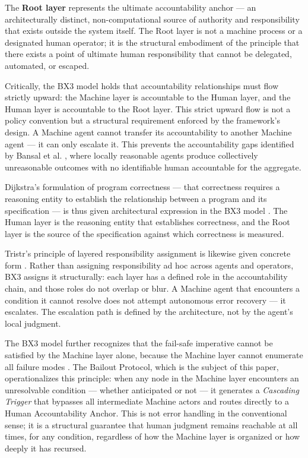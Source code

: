 The \textbf{Root layer} represents the ultimate accountability anchor — an architecturally distinct, non-computational source of authority and responsibility that exists outside the system itself. The Root layer is not a machine process or a designated human operator; it is the structural embodiment of the principle that there exists a point of ultimate human responsibility that cannot be delegated, automated, or escaped.

Critically, the BX3 model holds that accountability relationships must flow strictly upward: the Machine layer is accountable to the Human layer, and the Human layer is accountable to the Root layer. This strict upward flow is not a policy convention but a structural requirement enforced by the framework's design. A Machine agent cannot transfer its accountability to another Machine agent — it can only escalate it. This prevents the accountability gaps identified by Bansal et al. \cite{bansal2019}, where locally reasonable agents produce collectively unreasonable outcomes with no identifiable human accountable for the aggregate.

Dijkstra's formulation of program correctness — that correctness requires a reasoning entity to establish the relationship between a program and its specification — is thus given architectural expression in the BX3 model \cite{dijkstra1982}. The Human layer is the reasoning entity that establishes correctness, and the Root layer is the source of the specification against which correctness is measured.

Tristr's principle of layered responsibility assignment is likewise given concrete form \cite{tristr81}. Rather than assigning responsibility ad hoc across agents and operators, BX3 assigns it structurally: each layer has a defined role in the accountability chain, and those roles do not overlap or blur. A Machine agent that encounters a condition it cannot resolve does not attempt autonomous error recovery — it escalates. The escalation path is defined by the architecture, not by the agent's local judgment.

The BX3 model further recognizes that the fail-safe imperative cannot be satisfied by the Machine layer alone, because the Machine layer cannot enumerate all failure modes \cite{dijkstra1982}. The Bailout Protocol, which is the subject of this paper, operationalizes this principle: when any node in the Machine layer encounters an unresolvable condition — whether anticipated or not — it generates a \emph{Cascading Trigger} that bypasses all intermediate Machine actors and routes directly to a Human Accountability Anchor. This is not error handling in the conventional sense; it is a structural guarantee that human judgment remains reachable at all times, for any condition, regardless of how the Machine layer is organized or how deeply it has recursed.

